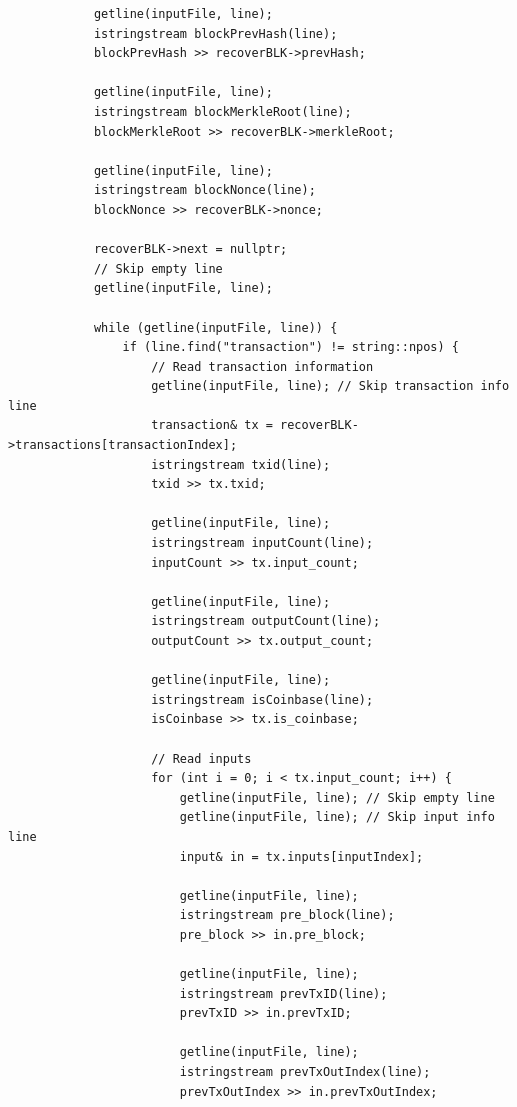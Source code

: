 \documentclass[10pt,a4paper]{article}
\begin{document}
\begin{verbatim}
            getline(inputFile, line);
            istringstream blockPrevHash(line);
            blockPrevHash >> recoverBLK->prevHash;
    
            getline(inputFile, line);
            istringstream blockMerkleRoot(line);
            blockMerkleRoot >> recoverBLK->merkleRoot;
    
            getline(inputFile, line);
            istringstream blockNonce(line);
            blockNonce >> recoverBLK->nonce;
    
            recoverBLK->next = nullptr;
            // Skip empty line
            getline(inputFile, line);
    
            while (getline(inputFile, line)) {
                if (line.find("transaction") != string::npos) {
                    // Read transaction information
                    getline(inputFile, line); // Skip transaction info line
                    transaction& tx = recoverBLK->transactions[transactionIndex];
                    istringstream txid(line);
                    txid >> tx.txid;
    
                    getline(inputFile, line);
                    istringstream inputCount(line);
                    inputCount >> tx.input_count;
    
                    getline(inputFile, line);
                    istringstream outputCount(line);
                    outputCount >> tx.output_count;
    
                    getline(inputFile, line);
                    istringstream isCoinbase(line);
                    isCoinbase >> tx.is_coinbase;
    
                    // Read inputs
                    for (int i = 0; i < tx.input_count; i++) {
                        getline(inputFile, line); // Skip empty line
                        getline(inputFile, line); // Skip input info line
                        input& in = tx.inputs[inputIndex];
                        
                        getline(inputFile, line);
                        istringstream pre_block(line);
                        pre_block >> in.pre_block;
                        
                        getline(inputFile, line);
                        istringstream prevTxID(line);
                        prevTxID >> in.prevTxID;
    
                        getline(inputFile, line);
                        istringstream prevTxOutIndex(line);
                        prevTxOutIndex >> in.prevTxOutIndex;
    

\end{verbatim}
\end{document}
